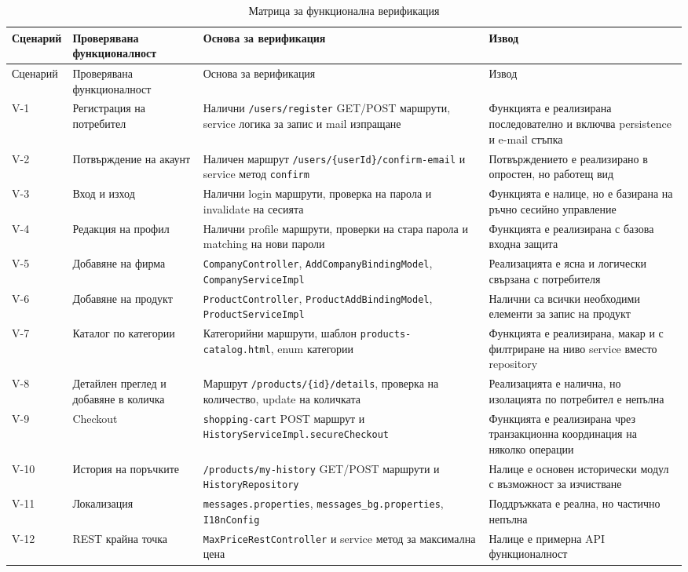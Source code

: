\begin{longtable}{L{1.9cm}L{3.2cm}L{4.0cm}L{4.7cm}}
\caption{Матрица за функционална верификация}\label{tab:verification-matrix}\\
\toprule
Сценарий & Проверявана функционалност & Основа за верификация & Извод \\
\midrule
\endfirsthead
\toprule
Сценарий & Проверявана функционалност & Основа за верификация & Извод \\
\midrule
\endhead
V-1 & Регистрация на потребител & Налични \texttt{/users/register} GET/POST маршрути, service логика за запис и mail изпращане & Функцията е реализирана последователно и включва persistence и e-mail стъпка \\
V-2 & Потвърждение на акаунт & Наличен маршрут \texttt{/users/\{userId\}/confirm-email} и service метод \texttt{confirm} & Потвърждението е реализирано в опростен, но работещ вид \\
V-3 & Вход и изход & Налични login маршрути, проверка на парола и invalidate на сесията & Функцията е налице, но е базирана на ръчно сесийно управление \\
V-4 & Редакция на профил & Налични profile маршрути, проверки на стара парола и matching на нови пароли & Функцията е реализирана с базова входна защита \\
V-5 & Добавяне на фирма & \texttt{CompanyController}, \texttt{AddCompanyBindingModel}, \texttt{CompanyServiceImpl} & Реализацията е ясна и логически свързана с потребителя \\
V-6 & Добавяне на продукт & \texttt{ProductController}, \texttt{ProductAddBindingModel}, \texttt{ProductServiceImpl} & Налични са всички необходими елементи за запис на продукт \\
V-7 & Каталог по категории & Категорийни маршрути, шаблон \texttt{products-catalog.html}, enum категории & Функцията е реализирана, макар и с филтриране на ниво service вместо repository \\
V-8 & Детайлен преглед и добавяне в количка & Маршрут \texttt{/products/\{id\}/details}, проверка на количество, update на количката & Реализацията е налична, но изолацията по потребител е непълна \\
V-9 & Checkout & \texttt{shopping-cart} POST маршрут и \texttt{HistoryServiceImpl.secureCheckout} & Функцията е реализирана чрез транзакционна координация на няколко операции \\
V-10 & История на поръчките & \texttt{/products/my-history} GET/POST маршрути и \texttt{HistoryRepository} & Налице е основен исторически модул с възможност за изчистване \\
V-11 & Локализация & \texttt{messages.properties}, \texttt{messages\_bg.properties}, \texttt{I18nConfig} & Поддръжката е реална, но частично непълна \\
V-12 & REST крайна точка & \texttt{MaxPriceRestController} и service метод за максимална цена & Налице е примерна API функционалност \\
\bottomrule
\end{longtable}


